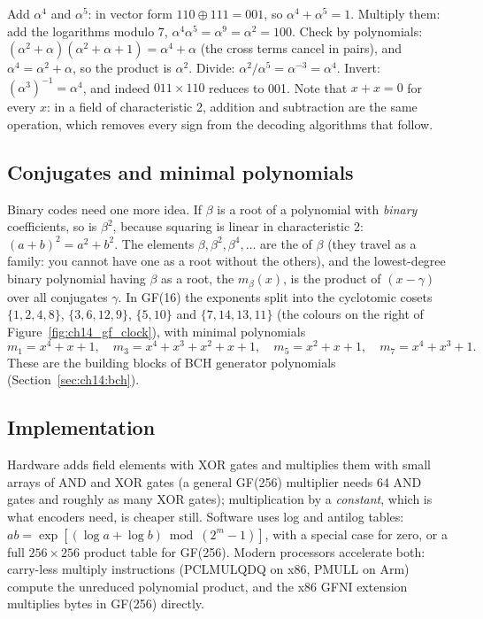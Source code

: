 \begin{worked}[Arithmetic in GF(8)]
Add $\alpha^4$ and $\alpha^5$: in vector form $110\oplus111=001$, so $\alpha^4+\alpha^5=1$.
Multiply them: add the logarithms modulo 7, $\alpha^4\alpha^5=\alpha^9=\alpha^2=100$. Check by
polynomials: $(\alpha^2+\alpha)(\alpha^2+\alpha+1)=\alpha^4+\alpha$ (the cross terms cancel in
pairs), and $\alpha^4=\alpha^2+\alpha$, so the product is $\alpha^2$. Divide: $\alpha^2/\alpha^5=
\alpha^{-3}=\alpha^4$. Invert: $(\alpha^3)^{-1}=\alpha^{4}$, and indeed $011\times110$ reduces to 001.
Note that $x+x=0$ for every $x$: in a field of characteristic 2, addition and subtraction are the
same operation, which removes every sign from the decoding algorithms that follow.
\end{worked}

\subsection{Conjugates and minimal polynomials}

Binary codes need one more idea. If $\beta$ is a root of a polynomial with \emph{binary}
coefficients, so is $\beta^2$, because squaring is linear in characteristic 2:
$(a+b)^2=a^2+b^2$. The elements $\beta,\beta^2,\beta^4,\dots$ are the  of $\beta$
(they travel as a family: you cannot have one as a root without the others), and the lowest-degree
binary polynomial having $\beta$ as a root, the  $m_\beta(x)$, is the product
of $(x-\gamma)$ over all conjugates $\gamma$. In GF(16) the exponents split into the cyclotomic cosets
$\{1,2,4,8\}$, $\{3,6,12,9\}$, $\{5,10\}$ and $\{7,14,13,11\}$ (the colours on the right of
Figure~\ref{fig:ch14_gf_clock}), with minimal polynomials
\[
m_1=x^4+x+1,\quad m_3=x^4+x^3+x^2+x+1,\quad m_5=x^2+x+1,\quad m_7=x^4+x^3+1 .
\]
These are the building blocks of BCH generator polynomials (Section~\ref{sec:ch14:bch}).

\subsection{Implementation}

Hardware adds field elements with XOR gates and multiplies them with small arrays of AND and XOR
gates (a general GF(256) multiplier needs 64 AND gates and roughly as many XOR gates);
multiplication by a \emph{constant}, which is what encoders need, is cheaper still. Software uses
log and antilog tables: $ab=\exp[(\log a+\log b)\bmod(2^m-1)]$, with a special case for zero, or a
full $256\times256$ product table for GF(256). Modern processors accelerate both: carry-less
multiply instructions (PCLMULQDQ on x86, PMULL on Arm) compute the unreduced polynomial product,
and the x86 GFNI extension multiplies bytes in GF(256) directly.

